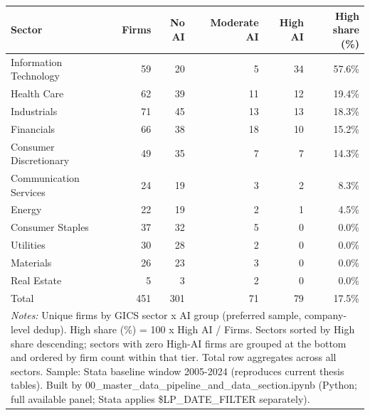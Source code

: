\begin{tabular}{lrrrrr}
\toprule
Sector & Firms & No AI & Moderate AI & High AI & High share (\%) \\
\midrule
Information Technology & 59 & 20 & 5 & 34 & 57.6\% \\
Health Care & 62 & 39 & 11 & 12 & 19.4\% \\
Industrials & 71 & 45 & 13 & 13 & 18.3\% \\
Financials & 66 & 38 & 18 & 10 & 15.2\% \\
Consumer Discretionary & 49 & 35 & 7 & 7 & 14.3\% \\
Communication Services & 24 & 19 & 3 & 2 & 8.3\% \\
Energy & 22 & 19 & 2 & 1 & 4.5\% \\
Consumer Staples & 37 & 32 & 5 & 0 & 0.0\% \\
Utilities & 30 & 28 & 2 & 0 & 0.0\% \\
Materials & 26 & 23 & 3 & 0 & 0.0\% \\
Real Estate & 5 & 3 & 2 & 0 & 0.0\% \\
Total & 451 & 301 & 71 & 79 & 17.5\% \\
\bottomrule
\multicolumn{6}{p{0.95\linewidth}}{\footnotesize \textit{Notes:} Unique firms by GICS sector x AI group (preferred sample, company-level dedup). High share (\%) = 100 x High AI / Firms. Sectors sorted by High share descending; sectors with zero High-AI firms are grouped at the bottom and ordered by firm count within that tier. Total row aggregates across all sectors. Sample: Stata baseline window 2005-2024 (reproduces current thesis tables). Built by 00\_master\_data\_pipeline\_and\_data\_section.ipynb (Python; full available panel; Stata applies \$LP\_DATE\_FILTER separately).} \\
\end{tabular}
